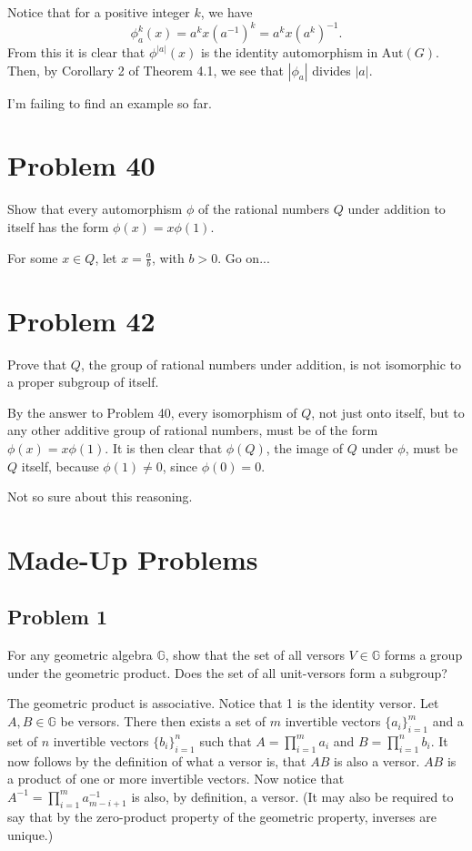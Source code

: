 \documentclass[12pt]{article}
\newcommand{\G}{\mathbb{G}}
\newcommand{\aut}{\mbox{Aut}}
\begin{document}
Notice that for a positive integer $k$, we have
\begin{equation*}
\phi_a^k(x) = a^kx(a^{-1})^k=a^kx(a^k)^{-1}.
\end{equation*}
From this it is clear that $\phi^{|a|}(x)$ is the identity automorphism in $\aut(G)$.
Then, by Corollary 2 of Theorem 4.1, we see that $|\phi_a|$ divides $|a|$.

I'm failing to find an example so far.

\section*{Problem 40}

Show that every automorphism $\phi$ of the rational numbers $Q$ under
addition to itself has the form $\phi(x)=x\phi(1)$.

For some $x\in Q$, let $x=\frac{a}{b}$, with $b>0$.  Go on...

\section*{Problem 42}

Prove that $Q$, the group of rational numbers under addition, is not
isomorphic to a proper subgroup of itself.

By the answer to Problem 40, every isomorphism of $Q$, not just onto itself,
but to any other additive group of rational numbers, must be of the form $\phi(x)=x\phi(1)$.
It is then clear that $\phi(Q)$, the image of $Q$ under $\phi$, must be $Q$ itself,
because $\phi(1)\neq 0$, since $\phi(0)=0$.

Not so sure about this reasoning.

\section*{Made-Up Problems}

\subsection*{Problem 1}

For any geometric algebra $\G$, show that
the set of all versors $V\in\G$ forms a group under the geometric product.
Does the set of all unit-versors form a subgroup?

The geometric product is associative.
Notice that 1 is the identity versor.  Let $A,B\in\G$ be versors.
There then exists a set of $m$ invertible vectors $\{a_i\}_{i=1}^m$ and
a set of $n$ invertible vectors $\{b_i\}_{i=1}^n$ such that
$A=\prod_{i=1}^m a_i$ and $B=\prod_{i=1}^n b_i$.
It now follows by the definition of what a versor is, that $AB$ is also a versor.
$AB$ is a product of one or more invertible vectors.
Now notice that $A^{-1}=\prod_{i=1}^m a_{m-i+1}^{-1}$ is also, by
definition, a versor.  (It may also be required to say that by the zero-product
property of the geometric property, inverses are unique.)
\end{document}
